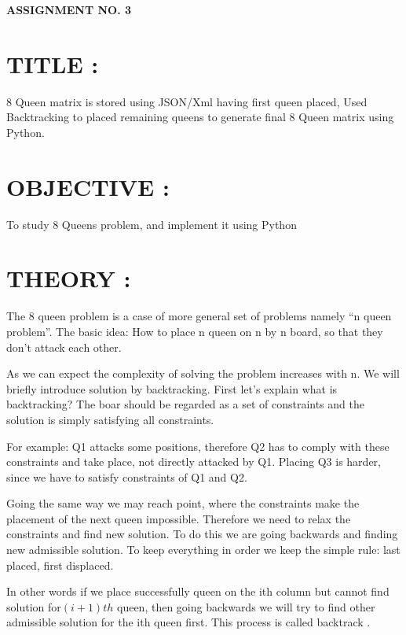 \documentclass{article}
\begin{document}
	
	\begin{center}
		\textbf{\bfseries\Large ASSIGNMENT NO. 3}
		\\[1cm]
	\end{center}
	
	
	\section{TITLE : }   8 Queen matrix is stored using JSON/Xml having first queen placed, Used Backtracking to placed remaining queens to generate final 8 Queen matrix using Python.
	
	\section{OBJECTIVE : }  To study 8 Queens problem, and implement it using Python
	
	\section{THEORY : }
	
	The 8 queen problem is a case of more general set of problems namely “n queen problem”. The basic idea: How to place n queen on n by n board, so that they don’t attack each other.
	
	As we can expect the complexity of solving the problem increases with n. We will briefly introduce solution by backtracking.  First let’s explain what is backtracking? The boar should be regarded as a set of constraints and the solution is simply satisfying all constraints. 
	
	For example: Q1 attacks some positions, therefore Q2 has to comply with these constraints and take place, not directly attacked by Q1. Placing Q3 is harder, since we have to satisfy constraints of Q1 and Q2. 
	
	Going the same way we may reach point, where the constraints make the placement of the next queen impossible. Therefore we need to relax the constraints and find new solution. To do this we are going backwards and finding new admissible solution. To keep everything in order we keep the simple rule: last placed, first displaced. 
	
	In other words if we place successfully queen on the ith column but cannot find solution for$ (i+1)th$ queen, then going backwards we will try to find other admissible solution for the ith queen first. This process is called backtrack  .\\
	
\end{document}
